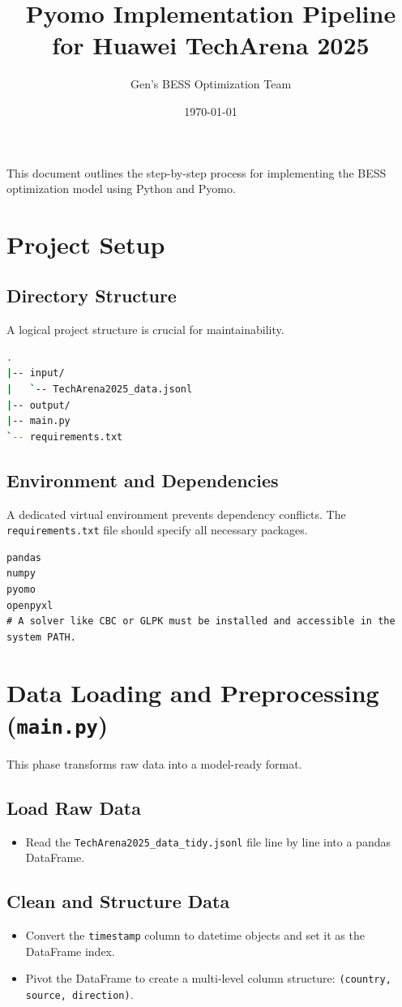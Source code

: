 \documentclass{article}
\title{Pyomo Implementation Pipeline for Huawei TechArena 2025}
\author{Gen's BESS Optimization Team}
\date{\today}
\begin{document}
\maketitle

This document outlines the step-by-step process for implementing the BESS optimization model using Python and Pyomo.

\section{Project Setup}

\subsection{Directory Structure}
A logical project structure is crucial for maintainability.
\begin{lstlisting}[language=bash, caption={Recommended Directory Structure}]
.
|-- input/
|   `-- TechArena2025_data.jsonl
|-- output/
|-- main.py
`-- requirements.txt
\end{lstlisting}

\subsection{Environment and Dependencies}
A dedicated virtual environment prevents dependency conflicts. The \texttt{requirements.txt} file should specify all necessary packages.
\begin{lstlisting}[caption={\texttt{requirements.txt}}]
pandas
numpy
pyomo
openpyxl
# A solver like CBC or GLPK must be installed and accessible in the system PATH.
\end{lstlisting}

\section{Data Loading and Preprocessing (\texttt{main.py})}
This phase transforms raw data into a model-ready format.

\subsection{Load Raw Data}
\begin{itemize}
    \item Read the \texttt{TechArena2025\_data\_tidy.jsonl} file line by line into a pandas DataFrame.
\end{itemize}

\subsection{Clean and Structure Data}
\begin{itemize}
    \item Convert the \texttt{timestamp} column to datetime objects and set it as the DataFrame index.
    \item Pivot the DataFrame to create a multi-level column structure: \texttt{(country, source, direction)}.
\end{itemize}
\end{document}
